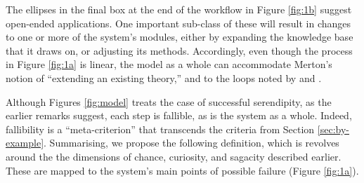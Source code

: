 %
%
%
%


The ellipses in the final box at the end of the workflow in Figure \ref{fig:1b} suggest
open-ended applications.  One important sub-class of these will result
in changes to one or more of the system's modules, either by expanding
the knowledge base that it draws on, or adjusting its methods.  
Accordingly, even though the process in Figure \ref{fig:1a} is linear,
the model as a whole can accommodate Merton's \cite{merton1948bearing}
notion of ``extending an existing theory,'' and to the loops noted by
\citet{lawley2008maximising} and \citet{Makri2012a}.


Although Figures \ref{fig:model} treats the case of
successful serendipity, as the earlier remarks suggest, each step is
fallible, as is the system as a whole. 
Indeed, fallibility is a ``meta-criterion'' that transcends the criteria from
Section \ref{sec:by-example}. 
Summarising, we propose the following definition, which is revolves
around the the dimensions of chance, curiosity, and sagacity described
earlier.  These are mapped to the system's main points of possible
failure (Figure \ref{fig:1a}).

